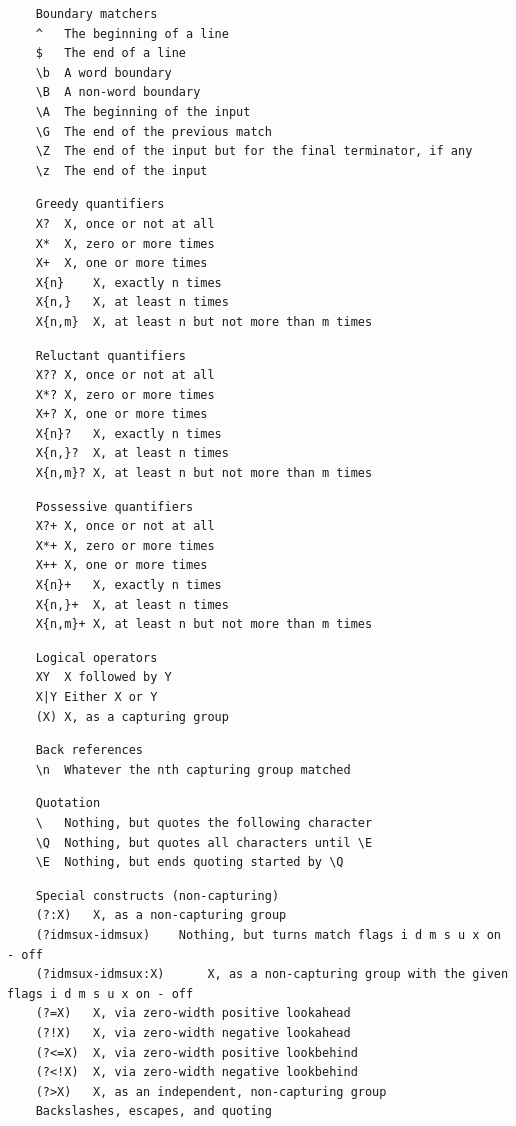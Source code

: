     \begin{verbatim}
    Boundary matchers
    ^	The beginning of a line
    $	The end of a line
    \b	A word boundary
    \B	A non-word boundary
    \A	The beginning of the input
    \G	The end of the previous match
    \Z	The end of the input but for the final terminator, if any
    \z	The end of the input
    \end{verbatim}

    \begin{verbatim}
    Greedy quantifiers
    X?	X, once or not at all
    X*	X, zero or more times
    X+	X, one or more times
    X{n}	X, exactly n times
    X{n,}	X, at least n times
    X{n,m}	X, at least n but not more than m times
    \end{verbatim}

    \begin{verbatim}
    Reluctant quantifiers
    X??	X, once or not at all
    X*?	X, zero or more times
    X+?	X, one or more times
    X{n}?	X, exactly n times
    X{n,}?	X, at least n times
    X{n,m}?	X, at least n but not more than m times
    \end{verbatim}

    \begin{verbatim}
    Possessive quantifiers
    X?+	X, once or not at all
    X*+	X, zero or more times
    X++	X, one or more times
    X{n}+	X, exactly n times
    X{n,}+	X, at least n times
    X{n,m}+	X, at least n but not more than m times
    \end{verbatim}

    \begin{verbatim}
    Logical operators
    XY	X followed by Y
    X|Y	Either X or Y
    (X)	X, as a capturing group
    \end{verbatim}

    \begin{verbatim}
    Back references
    \n	Whatever the nth capturing group matched
    \end{verbatim}

    \begin{verbatim}
    Quotation
    \	Nothing, but quotes the following character
    \Q	Nothing, but quotes all characters until \E
    \E	Nothing, but ends quoting started by \Q
    \end{verbatim}

    \begin{verbatim}
    Special constructs (non-capturing)
    (?:X)	X, as a non-capturing group
    (?idmsux-idmsux) 	Nothing, but turns match flags i d m s u x on - off
    (?idmsux-idmsux:X)  	X, as a non-capturing group with the given flags i d m s u x on - off
    (?=X)	X, via zero-width positive lookahead
    (?!X)	X, via zero-width negative lookahead
    (?<=X)	X, via zero-width positive lookbehind
    (?<!X)	X, via zero-width negative lookbehind
    (?>X)	X, as an independent, non-capturing group
    Backslashes, escapes, and quoting
    \end{verbatim}

